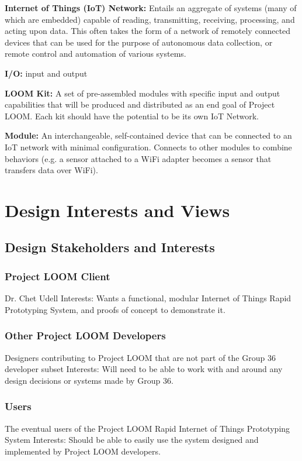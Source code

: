 \documentclass[onecolumn, draftclsnofoot,10pt, compsoc]{IEEEtran}
\begin{document}
    \textbf{Internet of Things (IoT) Network:} Entails an aggregate of systems (many of which are embedded) capable of reading, transmitting, receiving, processing, and acting upon data. This often takes the form of a network of remotely connected devices that can be used for the purpose of autonomous data collection, or remote control and automation of various systems.

    \textbf{I/O:} input and output

    \textbf{LOOM Kit:} A set of pre-assembled modules with specific input and output capabilities that will be produced and distributed as an end goal of Project LOOM. Each kit should have the potential to be its own IoT Network. 

    \textbf{Module:} An interchangeable, self-contained device that can be connected to an IoT network with minimal configuration. Connects to other modules to combine behaviors (e.g. a sensor attached to a WiFi adapter becomes a sensor that transfers data over WiFi).





\section{Design Interests and Views}
\subsection{Design Stakeholders and Interests}

\subsubsection{Project LOOM Client}
    Dr. Chet Udell
    Interests: Wants a functional, modular Internet of Things Rapid Prototyping System, and proofs of concept to demonstrate it.

\subsubsection{Other Project LOOM Developers}
    Designers contributing to Project LOOM that are not part of the Group 36 developer subset
    Interests: Will need to be able to work with and around any design decisions or systems made by Group 36.

\subsubsection{Users}
    The eventual users of the Project LOOM Rapid Internet of Things Prototyping System
    Interests: Should be able to easily use the system designed and implemented by Project LOOM developers.
\end{document}
